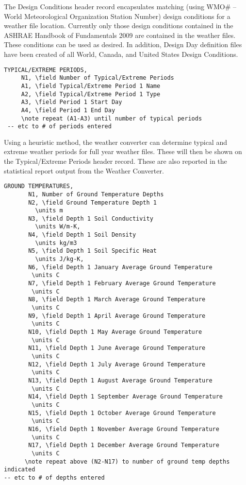 The Design Conditions header record encapsulates matching (using WMO\# -- World Meteorological Organization Station Number) design conditions for a weather file location. Currently only those design conditions contained in the ASHRAE Handbook of Fundamentals 2009 are contained in the weather files. These conditions can be used as desired. In addition, Design Day definition files have been created of all World, Canada, and United States Design Conditions.

\begin{lstlisting}
TYPICAL/EXTREME PERIODS,
     N1, \field Number of Typical/Extreme Periods
     A1, \field Typical/Extreme Period 1 Name
     A2, \field Typical/Extreme Period 1 Type
     A3, \field Period 1 Start Day
     A4, \field Period 1 End Day
     \note repeat (A1-A3) until number of typical periods
 -- etc to # of periods entered
\end{lstlisting}

Using a heuristic method, the weather converter can determine typical and extreme weather periods for full year weather files. These will then be shown on the Typical/Extreme Periods header record. These are also reported in the statistical report output from the Weather Converter.

\begin{lstlisting}
GROUND TEMPERATURES,
       N1, Number of Ground Temperature Depths
       N2, \field Ground Temperature Depth 1
         \units m
       N3, \field Depth 1 Soil Conductivity
         \units W/m-K,
       N4, \field Depth 1 Soil Density
         \units kg/m3
       N5, \field Depth 1 Soil Specific Heat
         \units J/kg-K,
       N6, \field Depth 1 January Average Ground Temperature
        \units C
       N7, \field Depth 1 February Average Ground Temperature
        \units C
       N8, \field Depth 1 March Average Ground Temperature
        \units C
       N9, \field Depth 1 April Average Ground Temperature
        \units C
       N10, \field Depth 1 May Average Ground Temperature
        \units C
       N11, \field Depth 1 June Average Ground Temperature
        \units C
       N12, \field Depth 1 July Average Ground Temperature
        \units C
       N13, \field Depth 1 August Average Ground Temperature
        \units C
       N14, \field Depth 1 September Average Ground Temperature
        \units C
       N15, \field Depth 1 October Average Ground Temperature
        \units C
       N16, \field Depth 1 November Average Ground Temperature
        \units C
       N17, \field Depth 1 December Average Ground Temperature
        \units C
      \note repeat above (N2-N17) to number of ground temp depths indicated
-- etc to # of depths entered
\end{lstlisting}

